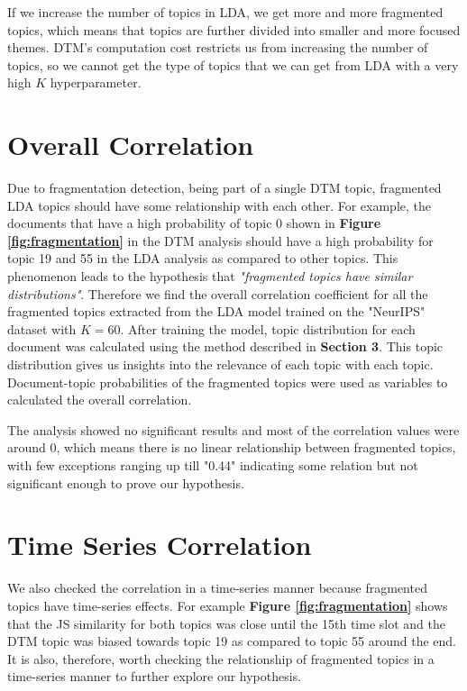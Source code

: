 If we increase the number of topics in LDA, we get more and more fragmented topics, which means that topics are further divided into smaller and more focused themes. DTM's computation cost restricts us from increasing the number of topics, so we cannot get the type of topics that we can get from LDA with a very high $K$ hyperparameter.

\section{Overall Correlation}
Due to fragmentation detection, being part of a single DTM topic, fragmented LDA topics should have some relationship with each other. For example, the documents that have a high probability of topic 0 shown in \textbf{Figure \ref{fig:fragmentation}} in the DTM analysis should have a high probability for topic 19 and 55 in the LDA analysis as compared to other topics. This phenomenon leads to the hypothesis that \textit{"fragmented topics have similar distributions"}. Therefore we find the overall correlation coefficient for all the fragmented topics extracted from the LDA model trained on the "NeurIPS" dataset with $K = 60$.
After training the model, topic distribution for each document was calculated using the method described in \textbf{Section 3}. This topic distribution gives us insights into the relevance of each topic with each topic. Document-topic probabilities of the fragmented topics were used as variables to calculated the overall correlation.

The analysis showed no significant results and most of the correlation values were around 0, which means there is no linear relationship between fragmented topics, with few exceptions ranging up till "0.44" indicating some relation but not significant enough to prove our hypothesis.

\section{Time Series Correlation}
We also checked the correlation in a time-series manner because fragmented topics have time-series effects. For example \textbf{Figure \ref{fig:fragmentation}} shows that the JS similarity for both topics was close until the 15th time slot and the DTM topic was biased towards topic 19 as compared to topic 55 around the end. It is also, therefore, worth checking the relationship of fragmented topics in a time-series manner to further explore our hypothesis.

